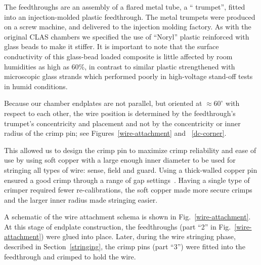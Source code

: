 The feedthroughs are an assembly of a flared metal tube, a `` trumpet'', fitted into an injection-molded 
plastic feedthrough.  The metal trumpets were produced on a screw machine, and 
delivered to the injection molding factory.
As with the original CLAS chambers we specified the use of
``Noryl'' plastic reinforced with glass beads to make it stiffer.
It is important to note that the surface conductivity
of this glass-bead loaded composite is little affected by room humidities
as high as 60\%, in contrast to similar plastic strengthened
with microscopic glass strands which performed poorly in high-voltage stand-off
tests in humid conditions.  

Because our chamber endplates are not parallel, but oriented at
$\approx 60^{\circ}$ with respect to each other, the wire position is determined
by the feedthrough's trumpet's concentricity and placement and not by
the concentricity or inner radius of the crimp pin; see Figures~\ref{wire-attachment} and ~\ref{dc-corner}.

This allowed us to design the crimp pin to maximize crimp reliability
and ease of use by using soft copper with a large enough inner diameter
to be used for stringing all types of wire: sense, field and guard.
Using a thick-walled copper pin ensured a good crimp through a range of gap settings~\cite{sbc}.
Having a single type of crimper required fewer re-calibrations, the soft
copper made more secure crimps and the larger inner radius made
stringing easier.

 A schematic of the wire attachment schema is shown in
Fig.~\ref{wire-attachment}.  At this stage of endplate construction, the
feedthroughs (part ``2'' in Fig.~\ref{wire-attachment}) were glued into place.
Later, during the wire stringing phase, described in Section~\ref{stringing},
the crimp pins (part ``3'') were fitted into the feedthrough and crimped to
hold the wire.  

